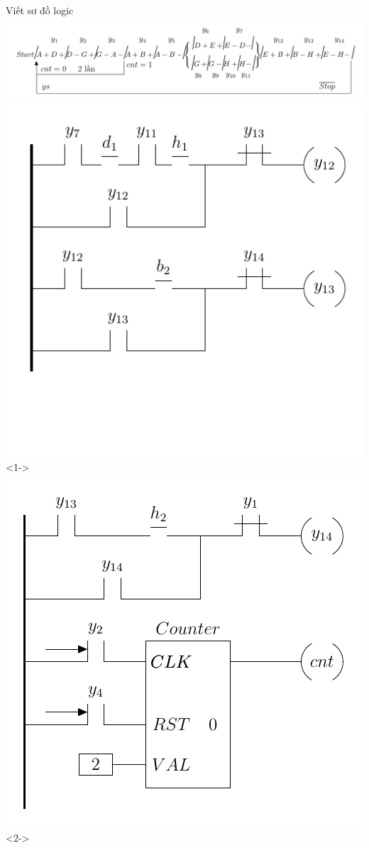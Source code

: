 \documentclass[24pt]{beamer}
\begin{document}
\begin{frame}[plain]{Viết sơ đồ logic}
	\vspace{-.5cm}
	\hspace{-1cm}\includegraphics[scale=0.7]{draw-tikz/quatrinh-bt4-buoc1-gomnhom.pdf}\\

	\includegraphics[scale=0.6]{draw-tikz/quatrinh-bt4-buoc2-sodologic-b7.pdf}<1->
	\hspace{0.5cm}\includegraphics[scale=0.6]{draw-tikz/quatrinh-bt4-buoc2-sodologic-b8.pdf}<2->
\end{frame}
\end{document}
